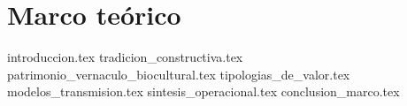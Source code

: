 \section{Marco teórico}

{introduccion.tex}
{tradicion_constructiva.tex}
{patrimonio_vernaculo_biocultural.tex}
{tipologias_de_valor.tex}
{modelos_transmision.tex}
{sintesis_operacional.tex}
{conclusion_marco.tex}



